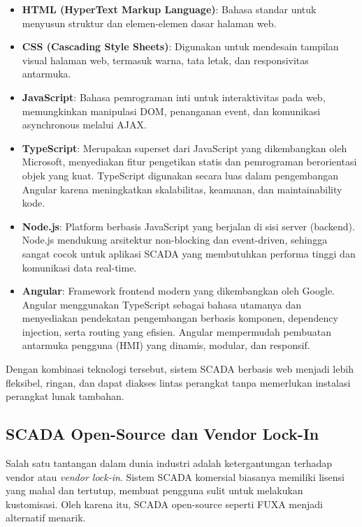 \begin{itemize}
    \item \textbf{HTML (HyperText Markup Language)}: Bahasa standar untuk menyusun struktur dan elemen-elemen dasar halaman web.
    
    \item \textbf{CSS (Cascading Style Sheets)}: Digunakan untuk mendesain tampilan visual halaman web, termasuk warna, tata letak, dan responsivitas antarmuka.
    
    \item \textbf{JavaScript}: Bahasa pemrograman inti untuk interaktivitas pada web, memungkinkan manipulasi DOM, penanganan event, dan komunikasi asynchronous melalui AJAX.
    
    \item \textbf{TypeScript}: Merupakan superset dari JavaScript yang dikembangkan oleh Microsoft, menyediakan fitur pengetikan statis dan pemrograman berorientasi objek yang kuat. TypeScript digunakan secara luas dalam pengembangan Angular karena meningkatkan skalabilitas, keamanan, dan maintainability kode.
    
    \item \textbf{Node.js}: Platform berbasis JavaScript yang berjalan di sisi server (backend). Node.js mendukung arsitektur non-blocking dan event-driven, sehingga sangat cocok untuk aplikasi SCADA yang membutuhkan performa tinggi dan komunikasi data real-time.
    
    \item \textbf{Angular}: Framework frontend modern yang dikembangkan oleh Google. Angular menggunakan TypeScript sebagai bahasa utamanya dan menyediakan pendekatan pengembangan berbasis komponen, dependency injection, serta routing yang efisien. Angular mempermudah pembuatan antarmuka pengguna (HMI) yang dinamis, modular, dan responsif.
\end{itemize}

Dengan kombinasi teknologi tersebut, sistem SCADA berbasis web menjadi lebih fleksibel, ringan, dan dapat diakses lintas perangkat tanpa memerlukan instalasi perangkat lunak tambahan.

\subsection{SCADA Open-Source dan Vendor Lock-In}
Salah satu tantangan dalam dunia industri adalah ketergantungan terhadap vendor atau \textit{vendor lock-in}. Sistem SCADA komersial biasanya memiliki lisensi yang mahal dan tertutup, membuat pengguna sulit untuk melakukan kustomisasi. Oleh karena itu, SCADA open-source seperti FUXA menjadi alternatif menarik.

